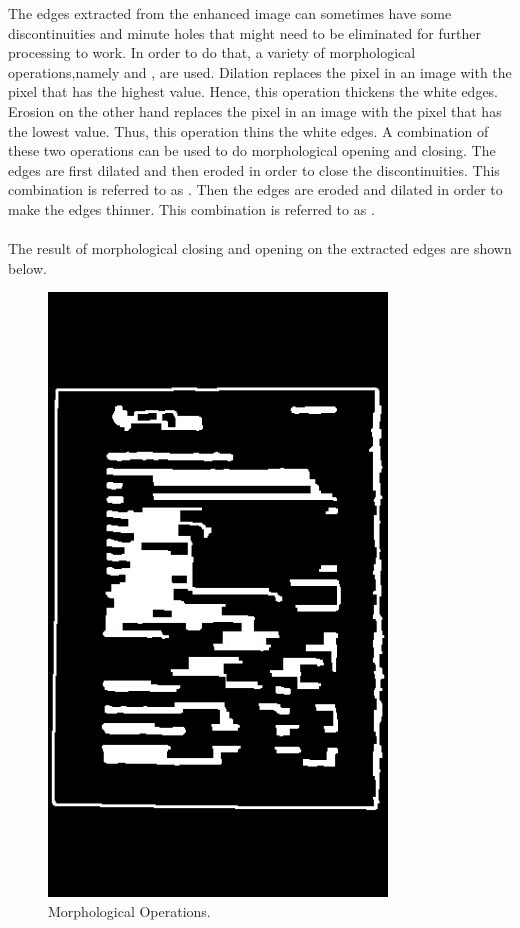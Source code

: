 The edges extracted from the enhanced image can sometimes have some discontinuities and minute holes that might need to be eliminated for further processing to work. In order to do that, a variety of morphological operations,namely  and , are used. Dilation replaces the pixel in an image with the pixel that has the highest value. Hence, this operation thickens the white edges. Erosion on the other hand replaces the pixel in an image with the pixel that has the lowest value. Thus, this operation thins the white edges. A combination of these two operations can be used to do morphological opening and closing. The edges are first dilated and then eroded in order to close the discontinuities. This combination is referred to as . Then the edges are eroded and dilated in order to make the edges thinner. This combination is referred to as .
\\
\\
The result of morphological closing and opening on the extracted edges are shown below.\\ 

\begin{figure}[th]
	\centering
	\includegraphics[height=16cm ]{Figures/morphological_operation}
	\caption[Morphological Operations]{Morphological Operations.}
	\label{fig:MorphologicalOperations}
\end{figure}

